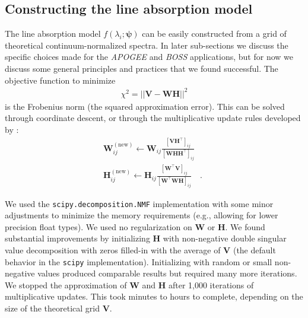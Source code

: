 \documentclass[modern]{aastex631}
\newcommand{\vecpsi}{\boldsymbol{\psi}}
\newcommand{\vecW}{\mathbf{W}}
\newcommand{\vecH}{\mathbf{H}}
\newcommand{\vecV}{\mathbf{V}}
\newcommand{\transpose}{^\top}
\begin{document}


\subsection{Constructing the line absorption model}

The line absorption model $f(\lambda_i;\vecpsi)$ can be easily constructed from a grid of theoretical continuum-normalized spectra. In later sub-sections we discuss the specific choices made for the \emph{APOGEE} and \emph{BOSS} applications, but for now we discuss some general principles and practices that we found successful. The objective function to minimize
\begin{align}
    \chi^2 = ||\vecV - \vecW\vecH||^2
\end{align}
\noindent{}is the Frobenius norm (the squared approximation error). This can be solved through coordinate descent, or through the multiplicative update rules developed by \citet{Lee:2000}:
\begin{align}
    \vecW_{ij}^{\mathrm{(new)}} \leftarrow \vecW_{ij} \frac{\left[\vecV\vecH\transpose\right]_{ij}}{\left[\vecW\vecH\vecH\transpose\right]_{ij}} \quad \phantom{.}\\
    \vecH_{ij}^{\mathrm{(new)}} \leftarrow \vecH_{ij} \frac{\left[\vecW\transpose\vecV\right]_{ij}}{\left[\vecW\transpose\vecW\vecH\right]_{ij}} \quad .
\end{align}

We used the \texttt{scipy.decomposition.NMF} implementation \citep{scipy} with some minor adjustments to minimize the memory requirements (e.g., allowing for lower precision float types). We used no regularization on $\vecW$ or $\vecH$. We found substantial improvements by initializing $\vecH$ with non-negative double singular value decomposition with zeros filled-in with the average of $\vecV$ (the default behavior in the \texttt{scipy} implementation). Initializing with random or small non-negative values produced comparable results but required many more iterations. We stopped the approximation of $\vecW$ and $\vecH$ after 1,000 iterations of multiplicative updates. This took minutes to hours to complete, depending on the size of the theoretical grid $\vecV$.\\
\end{document}
